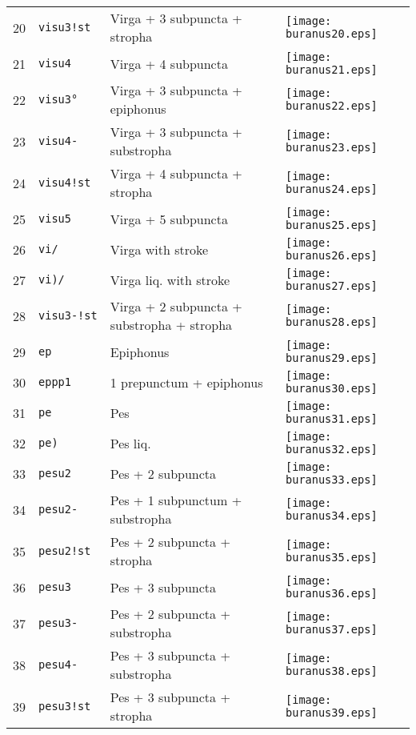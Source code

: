 \documentclass{scrarticle}
\begin{document}
\begin{longtable}{l|l|l|l}
20 & \texttt{visu3!st} & Virga + 3 subpuncta + stropha & \texttt{[image: buranus20.eps]} \\
21 & \texttt{visu4} & Virga + 4 subpuncta & \texttt{[image: buranus21.eps]} \\
22 & \texttt{visu3°} & Virga + 3 subpuncta + epiphonus & \texttt{[image: buranus22.eps]} \\
23 & \texttt{visu4-} & Virga + 3 subpuncta + substropha & \texttt{[image: buranus23.eps]} \\
24 & \texttt{visu4!st} & Virga + 4 subpuncta + stropha & \texttt{[image: buranus24.eps]} \\
25 & \texttt{visu5} & Virga + 5 subpuncta & \texttt{[image: buranus25.eps]} \\
26 & \texttt{vi/} & Virga with stroke & \texttt{[image: buranus26.eps]} \\
27 & \texttt{vi)/} & Virga liq. with stroke & \texttt{[image: buranus27.eps]} \\
28 & \texttt{visu3-!st} & Virga + 2 subpuncta + substropha + stropha & \texttt{[image: buranus28.eps]} \\
29 & \texttt{ep} & Epiphonus & \texttt{[image: buranus29.eps]} \\
30 & \texttt{eppp1} & 1 prepunctum + epiphonus & \texttt{[image: buranus30.eps]} \\
31 & \texttt{pe} & Pes & \texttt{[image: buranus31.eps]} \\
32 & \texttt{pe)} & Pes liq. & \texttt{[image: buranus32.eps]} \\
33 & \texttt{pesu2} & Pes + 2 subpuncta & \texttt{[image: buranus33.eps]} \\
34 & \texttt{pesu2-} & Pes + 1 subpunctum + substropha & \texttt{[image: buranus34.eps]} \\
35 & \texttt{pesu2!st} & Pes + 2 subpuncta + stropha & \texttt{[image: buranus35.eps]} \\
36 & \texttt{pesu3} & Pes + 3 subpuncta & \texttt{[image: buranus36.eps]} \\
37 & \texttt{pesu3-} & Pes + 2 subpuncta + substropha & \texttt{[image: buranus37.eps]} \\
38 & \texttt{pesu4-} & Pes + 3 subpuncta + substropha & \texttt{[image: buranus38.eps]} \\
39 & \texttt{pesu3!st} & Pes + 3 subpuncta + stropha & \texttt{[image: buranus39.eps]} \\

\end{longtable}
\end{document}
